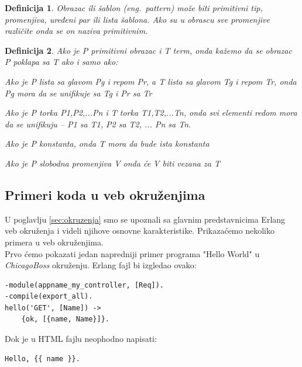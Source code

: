 \documentclass[a4paper]{article}
\newtheorem{definition}{Definicija}
\begin{document}
\begin{definition}{Obrazac ili šablon (eng.~{\em pattern})}
može biti primitivni tip, promenjiva, uređeni par ili lista šablona.
Ako su u obrascu sve promenjive različite onda se on naziva primitivnim.
\end{definition}

\begin{definition}{}
Ako je P  primitivni obrazac i T term, onda kažemo da se obrazac P poklapa sa T ako i samo ako:
\begin{list}{•}{}
\item Ako je P lista sa glavom Pg i repom Pr, a T lista sa glavom Tg i repom Tr, onda Pg mora da se unifikuje sa Tg i Pr sa Tr
\item Ako je P torka {P1,P2,...Pn} i T torka {T1,T2,...Tn}, onda svi elementi redom mora da se unifikuju – P1 sa T1, P2 sa T2, ... Pn sa Tn.
\item Ako je P konstanta, onda T mora da bude ista konstanta
\item Ako je P slobodna promenjiva V onda će V biti vezana za T
\end{list}
\end{definition}



\subsection{Primeri koda u veb okruženjima}
\label{sec:dodatak_primeri_okruzenja}
U poglavlju \ref{sec:okruzenja} smo se upoznali sa glavnim predstavnicima Erlang veb okruženja i videli njihove osnovne karakteristike. 
Prikazaćemo nekoliko primera u veb okruženjima. \\ 

Prvo ćemo pokazati jedan napredniji primer programa "Hello World" u {\em ChicagoBoss} okruženju. Erlang fajl bi izgledao ovako:
\begin{verbatim}
-module(appname_my_controller, [Req]).
-compile(export_all).
hello('GET', [Name]) ->
	{ok, [{name, Name}]}.
\end{verbatim}

Dok je u HTML fajlu neophodno napisati:
\begin{verbatim}
Hello, {{ name }}.
\end{verbatim} 
\end{document}
